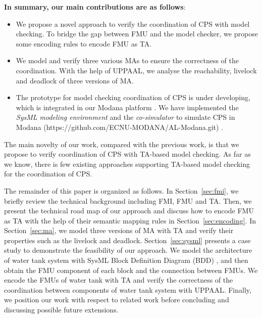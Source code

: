 \textbf{In summary, our main contributions are as follows}:
\begin{itemize}
\item
We propose a novel approach to verify the coordination of CPS with model checking. To bridge the gap between FMU and the model checker, we propose some encoding rules to encode FMU as TA.
\item
We model and verify three various MAs to ensure the correctness of the coordination. With the help of UPPAAL, we analyse the reachability, livelock and deadlock of three versions of MA.
\item
The prototype for model checking coordination of CPS is under developing, which is integrated in our Modana platform \cite{Cheng2015Modana}. We have implemented the \textit{SysML modeling environment} and the \textit{co-simulator} to simulate CPS in Modana (https://github.com/ECNU-MODANA/AL-Modana.git) \cite{Fritzson1998Modelica}.
\end{itemize}
The main novelty of our work, compared with the previous work, is that we propose to verify coordination of CPS with TA-based model checking. As far as we know, there is few existing approaches supporting TA-based model checking for the coordination of CPS.

The remainder of this paper is organized as follows. In Section~\ref{sec:fmi}, we briefly review the technical background including FMI, FMU and TA. Then, we present the technical road map of our approach and discuss how to encode FMU as TA with the help of their semantic mapping rules in Section~\ref{sec:encoding}. In Section~\ref{sec:ma}, we model three versions of MA with TA and verify their properties such as the livelock and deadlock. Section~\ref{sec:sysml} presents a case study to demonstrate the feasibility of our approach. We model the architecture of water tank system with SysML Block Definition Diagram (BDD) \cite{SemerathBHSV17}, and then obtain the FMU component of each block and the connection between FMUs. We encode the FMUs of water tank with TA and verify the correctness of the coordination between components of water tank system with UPPAAL. Finally, we position our work with respect to related work before concluding and discussing possible future extensions.




















